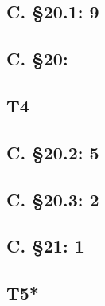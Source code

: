 \documentclass{article}
\begin{document}
\subsection{C. \S20.1: 9}
\subsection{C. \S20:}
\subsection{T4}
\subsection{C. \S20.2: 5}
\subsection{C. \S20.3: 2}
\subsection{C. \S21: 1}
\subsection{T5*}
\end{document}
